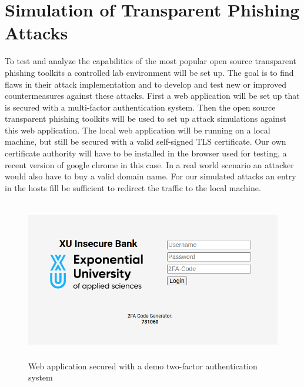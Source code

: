 \documentclass[12pt]{report}
\begin{document}
\section{Simulation of Transparent Phishing Attacks}
To test and analyze the capabilities of the most popular open source transparent phishing toolkits
a controlled lab environment will be set up. The goal is to find flaws in their attack implementation
and to develop and test new or improved countermeasures against these attacks.
First a web application will be set up that is secured with a multi-factor authentication system.
Then the open source transparent phishing toolkits will be used to set up attack simulations against
this web application. The local web application will be running on a local machine, but still be secured
with a valid self-signed TLS certificate. Our own certificate authority will have to be installed in the
browser used for testing, a recent version of google chrome in this case. In a real world scenario an attacker
would also have to buy a valid domain name. For our simulated attacks an entry in the hosts fill be sufficient
to redirect the traffic to the local machine.

\begin{figure}[!htb]
  \centering
  \includegraphics[height=7cm]{./images/2fa_app.png}
  \caption{Web application secured with a demo two-factor authentication system}
\end{figure}
\end{document}
